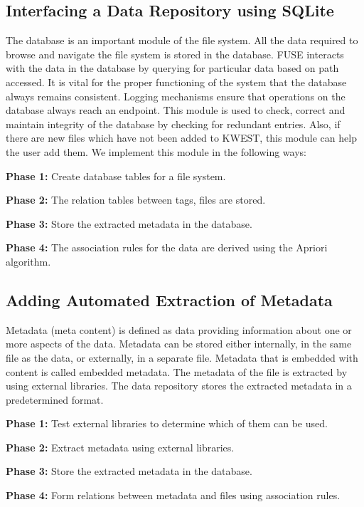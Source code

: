 \subsection{Interfacing a Data Repository using SQLite}
The database is an important module of the file system. All the data required to browse and navigate the file system is stored in the database. FUSE interacts with the data in the database by querying for particular data based on path accessed. It is vital for the proper functioning of the system that the database always remains consistent. Logging mechanisms ensure that operations on the database always reach an endpoint. This module is used to check, correct and maintain integrity of the database by checking for redundant entries. Also, if there are new files which have not been added to KWEST, this module can help the user add them. We implement this module in the following ways:
\begin{list}{•}{•}
\item \textbf{Phase 1:} Create database tables for a file system.
\item \textbf{Phase 2:} The relation tables between tags, files are stored.
\item \textbf{Phase 3:} Store the extracted metadata in the database.
\item \textbf{Phase 4:} The association rules for the data are derived using the Apriori algorithm.
\end{list}

\subsection{Adding Automated Extraction of Metadata}
Metadata (meta content) is defined as data providing information about one or more aspects of the data. Metadata can be stored either internally, in the same file as the data, or externally, in a separate file. Metadata that is embedded with content is called embedded metadata.
The metadata of the file is extracted by using external libraries. The data repository stores the extracted metadata in a predetermined format. 
\begin{list}{•}{•}
\item \textbf{Phase 1:} Test external libraries to determine which of them can be used.
\item \textbf{Phase 2:} Extract metadata using external libraries.
\item \textbf{Phase 3:} Store the extracted metadata in the database.
\item \textbf{Phase 4:} Form relations between metadata and files using association rules.
\end{list}

